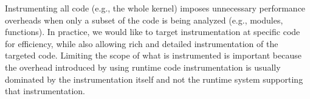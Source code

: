 \documentclass[preprint]{sigplanconf}
\begin{document}


Instrumenting all code (e.g., the whole kernel) imposes unnecessary performance overheads when only a subset of the code is being analyzed (e.g., modules, functions). In practice, we would like to target instrumentation at specific code for efficiency, while also allowing rich and detailed instrumentation of the targeted code. Limiting the scope of what is instrumented is  important because the overhead introduced by using runtime code instrumentation is usually dominated by the instrumentation itself and not the runtime system supporting that instrumentation.

\end{document}
